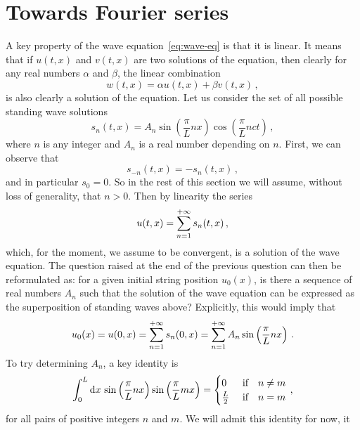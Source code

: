 \section{Towards Fourier series}
\label{sec:toward-fourier}
A key property of the wave equation~\cref{eq:wave-eq} is that it is linear. It means that
if $u(t,x)$ and $v(t,x)$ are two solutions of the equation, then clearly for any real
numbers $\alpha$ and $\beta$, the linear combination
\begin{equation}
	w(t,x)=\alpha u(t,x)+\beta v(t,x)\,,
\end{equation}
is also clearly a solution of the equation. Let us consider the set of all possible
standing wave solutions
\begin{equation}
	s_n(t,x)=A_n\sin\left(\frac{\pi}{L}nx\right)\cos\left(\frac{\pi}{L}nct\right)\,,
\end{equation}
where $n$ is any integer and $A_n$ is a real number depending on $n$. First, we can
observe that
\begin{equation}
	s_{-n}(t,x)=-s_n(t,x)\,,
\end{equation}
and in particular $s_0=0$. So in the rest of this section we will assume, without loss of
generality, that $n>0$. Then by linearity the series
\begin{equation}
	u(t,x)=\sum_{n=1}^{+\infty}s_n(t,x)\,,
\end{equation}
which, for the moment, we assume to be convergent, is a solution of the wave equation. The
question raised at the end of the previous question can then be reformulated as: for a
given initial string position $u_0(x)$, is there a sequence of real numbers $A_n$ such
that the solution of the wave equation can be expressed as the superposition of standing
waves above? Explicitly, this would imply that
\begin{equation}
	\label{eq:string-ic-fourier}
	u_0(x)=u(0,x)=\sum_{n=1}^{+\infty}s_n(0,x)=\sum_{n=1}^{+\infty}A_n\sin\left(\frac{\pi}{L}nx\right)\,.
\end{equation}
To try determining $A_n$, a key identity is
\begin{equation}
	\int_{0}^{L}\mathrm{d} x\,\sin\left(\frac{\pi}{L}nx\right)\sin\left(\frac{\pi}{L}mx\right)
	=
	\begin{cases}
		0           & ~\text{if}\quad n\neq m \\
		\frac{L}{2} & ~\text{if}\quad n=m
	\end{cases}
	\,,
\end{equation}
for all pairs of positive integers $n$ and $m$. We will admit this identity for now, it
